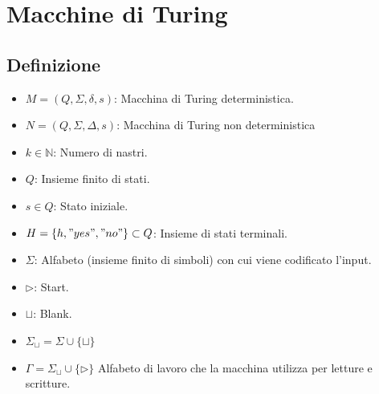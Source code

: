 \section{Macchine di Turing}
\subsection{Definizione}
\begin{itemize}
    \item $M = (Q, \Sigma, \delta, s)$: Macchina di Turing deterministica.
    \item $N = (Q, \Sigma, \Delta, s)$: Macchina di Turing non deterministica
    \item $k \in \mathbb{N}$: Numero di nastri.
\end{itemize}

\hrulefill

\begin{itemize}
    \item $Q$: Insieme finito di stati.
    \item $s \in Q$: Stato iniziale.
    \item $H = \{h, "yes", "no"\} \subset Q$: Insieme di stati terminali.
\end{itemize}

\hrulefill

\begin{itemize}
    \item $\Sigma$: Alfabeto (insieme finito di simboli) con cui viene codificato l'input.
    \item $\triangleright$: Start.
    \item $\sqcup$: Blank.
    \item $\Sigma_\sqcup = \Sigma \cup \{\sqcup\}$
    \item $\Gamma = \Sigma_\sqcup \cup \{\triangleright\}$ Alfabeto di lavoro che la macchina utilizza per letture e scritture.
\end{itemize}

\hrulefill

